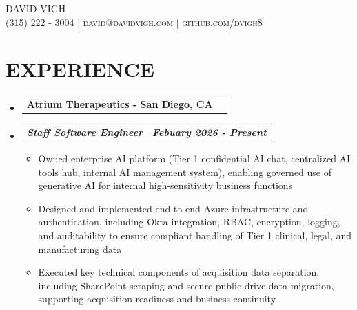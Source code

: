 \documentclass[letterpaper,11pt]{article}
\makeatletter
\newcommand{\resumeItem}[1]{
  \item\small{
    {#1 \vspace{0pt}}
  }
}
\newcommand{\resumeSubheading}[2]{
  \vspace{-1pt}\item
    \begin{tabular*}{0.97\textwidth}[t]{l@{\extracolsep{\fill}}r}
      \textbf{\small#1 - \small#2} 
    \end{tabular*}\vspace{-13pt}
}
\newcommand{\resumeSubSubheading}[2]{
    \item
    \vspace{2pt}
    \begin{tabular*}{0.97\textwidth}{l@{\extracolsep{\fill}}r}
      \textbf{\textit{\small#1}} & \textbf{\textit{\small#2}} \\
    \end{tabular*}\vspace{-5pt}
}
\newcommand{\resumeHeadingListStart}{\begin{itemize}[leftmargin=0.05in, label={}]}
\newcommand{\resumeHeadingListEnd}{\end{itemize}}
\newcommand{\resumeSubHeadingListStart}{\begin{itemize}[leftmargin=0.15in, label={}]}
\newcommand{\resumeSubHeadingListEnd}{\end{itemize}\vspace{-15pt}}
\newcommand{\resumeItemListStart}{\begin{itemize}[leftmargin=0.15in]}
\newcommand{\resumeItemListEnd}{\end{itemize}\vspace{-10pt}}
\makeatother
\begin{document}
\thispagestyle{fancy}
\fancyhf{} %
\fancyheadoffset[R]{-0.1cm}

\begin{center}
    \Huge \scshape DAVID VIGH \\ \vspace{1pt}
    \small (315) 222 - 3004 $|$ 
    \href{mailto:david@davidvigh.com}{david@davidvigh.com} $|$ 
    \href{https://github.com/dvigh8}{github.com/dvigh8} \\ \vspace{-5pt}
\end{center}


\section{\textbf{EXPERIENCE}}
    \resumeHeadingListStart
        \resumeSubheading{Atrium Therapeutics}{San Diego, CA}
    \resumeHeadingListEnd
        \resumeSubHeadingListStart
            \resumeSubSubheading {Staff Software Engineer}{Febuary 2026 - Present}
            \resumeItemListStart
                \resumeItem{Owned enterprise AI platform (Tier 1 confidential AI chat, centralized AI tools hub, internal AI management system), enabling governed use of generative AI for internal high-sensitivity business functions}
                \resumeItem{Designed and implemented end-to-end Azure infrastructure and authentication, including Okta integration, RBAC, encryption, logging, and auditability to ensure compliant handling of Tier 1 clinical, legal, and manufacturing data}
                \resumeItem{Executed key technical components of acquisition data separation, including SharePoint scraping and secure public-drive data migration, supporting acquisition readiness and business continuity}
            \resumeItemListEnd
        \resumeSubHeadingListEnd
\end{document}
